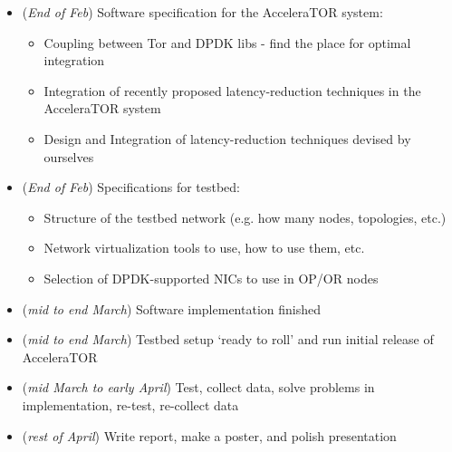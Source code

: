 \begin{itemize}

	\item (\textit{End of Feb}) Software specification for the AcceleraTOR system: 

	\begin{itemize}

		\item Coupling between Tor and DPDK libs - find the place for optimal 
		integration

		\item Integration of recently proposed latency-reduction techniques in 
		the AcceleraTOR system
		
		\item Design and Integration of latency-reduction techniques devised 
		by ourselves

	\end{itemize}

	\item (\textit{End of Feb}) Specifications for testbed:

	\begin{itemize}

		\item Structure of the testbed network (e.g. how many nodes, topologies, etc.)

		\item Network virtualization tools to use, how to use them, etc.

		\item Selection of DPDK-supported NICs to use in OP\slash OR nodes

	\end{itemize}

	\item (\textit{mid to end March}) Software implementation finished
	\item (\textit{mid to end March}) Testbed setup `ready to roll' and run initial release of 
		AcceleraTOR 
	\item (\textit{mid March to early April}) Test, collect data, solve problems in 
		implementation, re-test, re-collect data
	\item (\textit{rest of April}) Write report, make a poster, and polish presentation 

\end{itemize}

	
